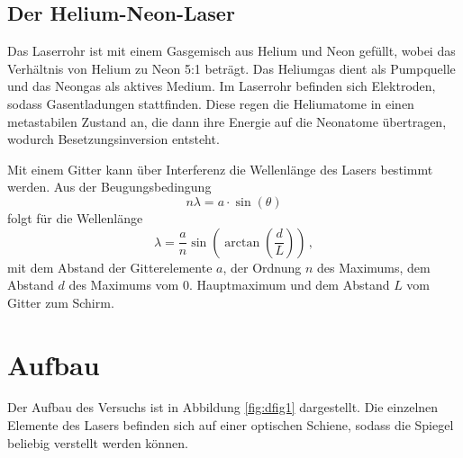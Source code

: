 \subsection*{Der Helium-Neon-Laser}
Das Laserrohr ist mit einem Gasgemisch aus Helium und Neon gefüllt, wobei das Verhältnis von Helium zu Neon 5:1 beträgt.
Das Heliumgas dient als Pumpquelle und das Neongas als aktives Medium. Im Laserrohr befinden sich Elektroden, sodass 
Gasentladungen stattfinden. Diese regen die Heliumatome in einen metastabilen Zustand an, die dann ihre Energie auf 
die Neonatome übertragen, wodurch Besetzungsinversion entsteht.

Mit einem Gitter kann über Interferenz die Wellenlänge des Lasers bestimmt werden. Aus der Beugungsbedingung 
\begin{equation*}
    n \lambda = a \cdot \sin \left(\theta \right)
\end{equation*}
folgt für die Wellenlänge
\begin{equation}
    \label{eq:Wellenlänge}
    \lambda = \frac{a}{n}  \sin \left(\arctan \left(\frac{d}{L}\right)\right)     \, ,
\end{equation}
mit dem Abstand der Gitterelemente $a$, der Ordnung $n$ des Maximums, dem Abstand $d$ des Maximums vom 0. Hauptmaximum
und dem Abstand $L$ vom Gitter zum Schirm.

\section{Aufbau}
Der Aufbau des Versuchs ist in Abbildung \ref{fig:dfig1} dargestellt. Die einzelnen Elemente des Lasers befinden sich 
auf einer optischen Schiene, sodass die Spiegel beliebig verstellt werden können. 

